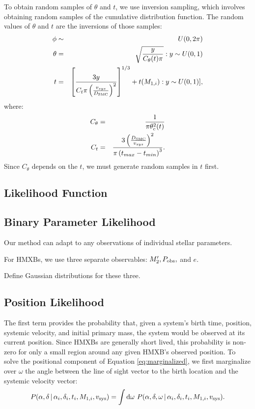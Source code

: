 \documentclass[12pt, preprint]{aastex}
\newcommand{\given}{\,|\,}
\newcommand{\dd}{\mathrm{d}}
\begin{document}
 To obtain random samples of $\theta$ and $t$, we use inversion sampling, which involves obtaining random samples of the cumulative distribution function. The random values of $\theta$ and $t$ are the inversions of those samples:
 \begin{eqnarray}
\phi &\sim& U(0, 2\pi) \\
\theta &=& \sqrt{\frac{y}{C_{\theta}(t) \pi}}: y \sim U(0,1) \\
t &=& \left[ \frac{3y}{C_t \pi \left( \frac{v_{sys}}{D_{\rm SMC}} \right)^2} \right]^{1/3} + t(M_{1,i}): y \sim U(0,1)], 
\end{eqnarray}
where:
\begin{eqnarray}
C_{\theta} &=& \frac{1}{\pi \theta_c^2(t)} \\
C_t &=& \frac{ 3 \left( \frac{D_{\rm SMC}}{v_{sys}} \right)^2 }{ \pi \left( t_{max} - t_{min} \right)^3 }.
\end{eqnarray}
Since $C_{\theta}$ depends on the $t$, we must generate random samples in $t$ first. 






\subsection{Likelihood Function} \label{sec:likelihood_indiv}

\subsection{Binary Parameter Likelihood}

Our method can adapt to any observations of individual stellar parameters.

For HMXBs, we use three separate observables: $M'_2, P_{\rm obs},$ and $e$.

Define Gaussian distributions for these three. 

\subsection{Position Likelihood}
The first term provides the probability that, given a system's birth time, position, systemic velocity, and initial primary mass, the system would be observed at its current position. Since HMXBs are generally short lived, this probability is non-zero for only a small region around any given HMXB's observed position. To solve the positional component of Equation \ref{eq:marginalized}, we first marginalize over $\omega$ the angle between the line of sight vector to the birth location and the systemic velocity vector:
\begin{equation}
P(\alpha, \delta \given \alpha_i, \delta_i, t_i, M_{1,i}, v_{\rm sys} ) = \int \dd \omega\ P(\alpha, \delta, \omega \given \alpha_i, \delta_i, t_i, M_{1,i}, v_{\rm sys} ). \label{eq:P_pos_1}
\end{equation}
\end{document}
